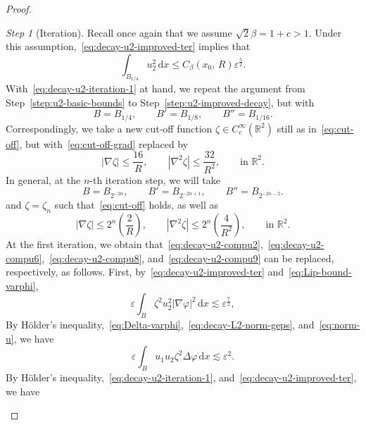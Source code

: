 \documentclass[a4paper, 11pt, twoside, leqno]{article}
\theoremstyle{definition}              %
\theoremstyle{remark}                  %
\newtheorem{step}{Step}
\DeclareMathOperator{\spt}{spt}                                     %
\newcommand{\abs}[1]{\left| #1 \right|}                             %
\newcommand{\csubset}{\subset\!\subset}                             %
\renewcommand{\d}{\mathrm{d}}
\newcommand{\R}{\mathbb{R}}
\newcommand{\eps}{\varepsilon}
\begin{document}
\begin{proof}
\begin{step}[Iteration]\label{step:decay-u2-iteration}
    Recall once again that we assume %
	$\sqrt{2}\beta = 1 + c > 1$. Under %
	this assumption,~\eqref{eq:decay-u2-improved-ter} implies that
    \begin{equation}\label{eq:decay-u2-iteration-1}
        \int_{B_{1/4}} u_2^2\,{\d}x \leq C_\beta(x_0,\,R) \eps^\frac{5}{2}.
    \end{equation}
    With~\eqref{eq:decay-u2-iteration-1} at hand, we repeat the argument from Step~\ref{step:u2-basic-bounds} to Step~\ref{step:u2-improved-decay}, but with 
    \[
        B = B_{1/4}, \qquad B' = B_{1/8}, \qquad B'' = B_{1/16}.
    \]
    Correspondingly, we take a new cut-off function $\zeta \in C^\infty_c(\R^2)$ still as in~\eqref{eq:cut-off}, but with~\eqref{eq:cut-off-grad} replaced by
    \[
        \abs{\nabla \zeta} \leq \frac{16}{R}, 
        \qquad \abs{\nabla^2 \zeta} \leq \frac{32}{R^2}, \qquad \mbox{in } \R^2.
    \]
    In general, at the $n$-th iteration step, we will take 
        \[
        B = B_{2^{-2n}}, \qquad B' = B_{2^{-2n+1}}, \qquad B'' = B_{2^{-2n-2}} .
    \]
    and $\zeta = \zeta_n$ such that~\eqref{eq:cut-off} holds, as well as
    \begin{equation}\label{eq:cut-off-grad-n}
        \abs{\nabla \zeta} \leq 2^n\left(\frac{2}{R}\right), 
        \qquad \abs{\nabla^2 \zeta} \leq 2^n\left(\frac{4}{R^2}\right), \qquad \mbox{in } \R^2.
    \end{equation}
    At the first iteration, we obtain that~\eqref{eq:decay-u2-compu2},~\eqref{eq:decay-u2-compu6},~\eqref{eq:decay-u2-compu8}, and~\eqref{eq:decay-u2-compu9} can be replaced, respectively, as follows. First, by~\eqref{eq:decay-u2-improved-ter} and~\eqref{eq:Lip-bound-varphi}, 
    \begin{equation}\label{eq:decay-u2-compu11}
        \eps \int_B \zeta^2 u_2^2 \abs{\nabla \varphi}^2 \,{\d}x \lesssim \eps^\frac{7}{2},
    \end{equation}
    By H\"{o}lder's inequality,~\eqref{eq:Delta-varphi},~\eqref{eq:decay-L2-norm-geps}, and~\eqref{eq:norm-u}, we have
    \begin{equation}\label{eq:decay-u2-compu12}
        \eps \int_B u_1 u_2 \zeta^2 \Delta \varphi\,{\d}x \lesssim \eps^2.
    \end{equation}
    By H\"{o}lder's inequality,~\eqref{eq:decay-u2-iteration-1}, 
    and~\eqref{eq:decay-u2-improved-ter}, we have 

\end{step}
\end{proof}
\end{document}
